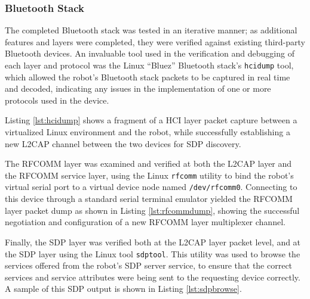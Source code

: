 \subsubsection{Bluetooth Stack}

The completed Bluetooth stack was tested in an iterative manner; as additional features and layers were completed, they were verified against existing third-party Bluetooth devices. An invaluable tool used in the verification and debugging of each layer and protocol was the Linux ``Bluez'' Bluetooth stack's \texttt{hcidump} tool, which allowed the robot's Bluetooth stack packets to be captured in real time and decoded, indicating any issues in the implementation of one or more protocols used in the device.

Listing \ref{lst:hcidump} shows a fragment of a HCI layer packet capture between a virtualized Linux environment and the robot, while successfully establishing a new L2CAP channel between the two devices for SDP discovery.



The RFCOMM layer was examined and verified at both the L2CAP layer and the RFCOMM service layer, using the Linux \texttt{rfcomm} utility to bind the robot's virtual serial port to a virtual device node named \texttt{/dev/rfcomm0}. Connecting to this device through a standard serial terminal emulator yielded the RFCOMM layer packet dump as shown in Listing \ref{lst:rfcommdump}, showing the successful negotiation and configuration of a new RFCOMM layer multiplexer channel.



Finally, the SDP layer was verified both at the L2CAP layer packet level, and at the SDP layer using the Linux tool \texttt{sdptool}. This utility was used to browse the services offered from the robot's SDP server service, to ensure that the correct services and service attributes were being sent to the requesting device correctly. A sample of this SDP output is shown in Listing \ref{lst:sdpbrowse}.



